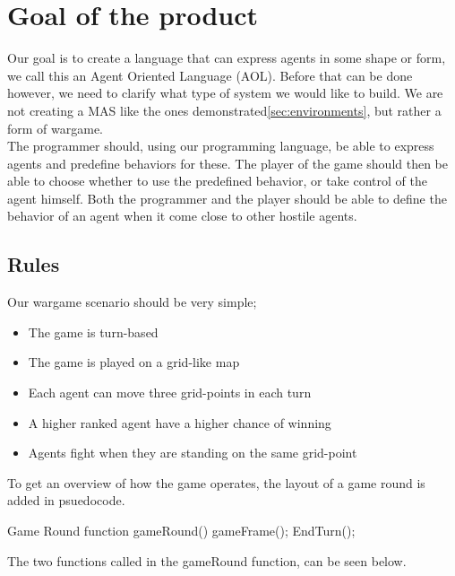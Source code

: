 \chapter{Goal of the product}

Our goal is to create a language that can express agents in some shape or form, we call this an Agent Oriented Language (AOL). Before that can be done however, we need to clarify what type of system we would like to build. We are not creating a MAS like the ones demonstrated\ref{sec:environments}, but rather a form of wargame.\\
\indent The programmer should, using our programming language, be able to express agents and predefine behaviors for these. The player of the game should then be able to choose whether to use the predefined behavior, or take control of the agent himself. Both the programmer and the player should be able to define the behavior of an agent when it come close to other hostile agents. \\

\section{Rules}
Our wargame scenario should be very simple;
\begin{itemize}
	\item The game is turn-based
	\item The game is played on a grid-like map
	\item Each agent can move three grid-points in each turn
	\item A higher ranked agent have a higher chance of winning
	\item Agents fight when they are standing on the same grid-point
\end{itemize}

To get an overview of how the game operates, the layout of a game round is added in psuedocode.

\begin{source}{Game Round}{}
function gameRound()
{
	gameFrame();
	EndTurn();
}
\end{source}

The two functions called in the gameRound function, can be seen below.

